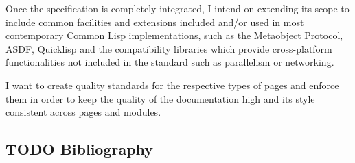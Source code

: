 Once the specification is completely integrated, I intend on extending
its scope to include common facilities and extensions included and/or
used in most contemporary Common Lisp implementations, such as the
Metaobject Protocol, ASDF, Quicklisp and the compatibility libraries
which provide cross-platform functionalities not included in the
standard such as parallelism or networking.

I want to create quality standards for the respective types of pages and
enforce them in order to keep the quality of the documentation high and
its style consistent across pages and modules.

\subsection{TODO Bibliography}\label{todo-bibliography}
